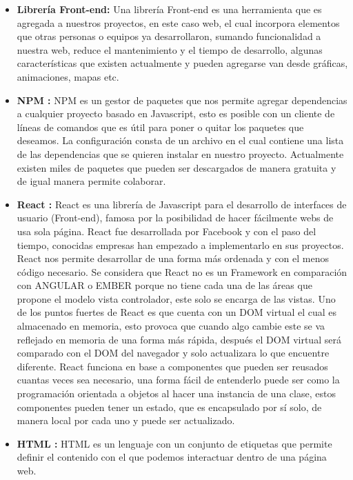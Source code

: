     \begin{itemize}
    
    	\item \textbf{Librería Front-end:} Una librería Front-end \cite{frontEnd2}es una herramienta que es agregada a nuestros proyectos, en este caso web, el cual incorpora elementos que otras personas o equipos ya desarrollaron, sumando funcionalidad a nuestra web, reduce el mantenimiento y el tiempo de desarrollo, algunas características que existen actualmente y pueden agregarse van desde gráficas, animaciones, mapas etc. 
      
       \item \textbf{NPM :} NPM \cite{npm} es un gestor de paquetes que nos permite agregar dependencias a cualquier proyecto basado en Javascript, esto es posible con un cliente de líneas de comandos que es útil para poner o quitar los paquetes que deseamos. La configuración consta de un archivo en el cual contiene una lista de las dependencias que se quieren instalar en nuestro proyecto. Actualmente existen miles de paquetes que pueden ser descargados de manera gratuita y de igual manera permite colaborar. 
       
       \item \textbf{ React :} React \cite{react} es una librería de Javascript para el desarrollo de interfaces de usuario (Front-end), famosa por la posibilidad de hacer fácilmente webs de usa sola página. React fue desarrollada por Facebook y con el paso del tiempo, conocidas empresas han empezado a implementarlo en sus proyectos. 
    React nos permite desarrollar de una forma más ordenada y con el menos código necesario. 
    Se considera que React no es un Framework en comparación con ANGULAR o EMBER porque no tiene cada una de las áreas que propone el modelo vista controlador, este solo se encarga de las vistas. 
    Uno de los puntos fuertes de React es que cuenta con un DOM virtual el cual es almacenado en memoria, esto provoca que cuando algo cambie este se va reflejado en memoria de una forma más rápida, después el DOM virtual será comparado con el DOM del navegador y solo actualizara lo que encuentre diferente. 
    React funciona en base a componentes que pueden ser reusados cuantas veces sea necesario, una forma fácil de entenderlo puede ser como la programación orientada a objetos al hacer una instancia de una clase, estos componentes pueden tener un estado, que es encapsulado por sí solo, de manera local por cada uno y puede ser actualizado.  
    
       \item \textbf{HTML  :}   HTML \cite{html} es un lenguaje con un conjunto de etiquetas que permite definir el contenido con el que podemos interactuar dentro de una página web. 
       

\end{itemize}
